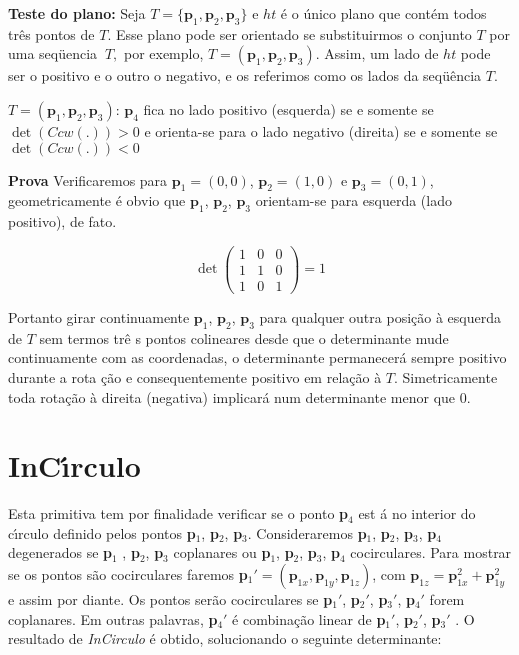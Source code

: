 \documentclass[12pt,a4paper]{book}
\begin{document}
\textbf{Teste do plano: }Seja $T=\{\mathbf{p}_{1},\mathbf{p}_{2},\mathbf{p}%
_{3}\}$ e $ht$ \'{e} o \'{u}nico plano que cont\'{e}m todos tr\^{e}s pontos
de $T$. Esse plano pode ser orientado se substituirmos o conjunto $T$ por
uma seq\"{u}encia $\ T,$ por exemplo, $T=(\mathbf{p}_{1},\mathbf{p}_{2},%
\mathbf{p}_{3}).$ Assim, um lado de $ht$ pode ser o positivo e o outro o
negativo, e os referimos como os lados da seq\"{u}\^{e}ncia $T$.

$T=(\mathbf{p}_{1},\mathbf{p}_{2},\mathbf{p}_{3})$: $\mathbf{p}_{4}$ fica no
lado positivo (esquerda) se e somente se $\det(Ccw(.))>0$ e orienta-se para o
lado negativo (direita) se e somente se $\det(Ccw(.))<0$

{\bf Prova}
 Verificaremos para $\mathbf{p}_{1}=(0,0)$, $\mathbf{p}_{2}=(1,0)$ e 
$\mathbf{p}_{3}=(0,1)$, geometricamente \'{e} obvio que $\mathbf{p}_{1}$,
$\mathbf{p}_{2}$, $\mathbf{p}_{3}$ orientam-se para esquerda (lado positivo), de
fato.

\begin{equation}
\det 
\left(\begin{array}{ccc}
1 & 0 & 0 \\ 
1 & 1 & 0 \\ 
1 & 0 & 1%
\end{array} \right)
=1
\end{equation}

Portanto girar continuamente $\mathbf{p}_{1}$, $\mathbf{p}_{2}$, $\mathbf{p}_{3}$
para qualquer outra posi\c{c}\~{a}o \`{a} esquerda de $T$ sem termos tr\^{e}%
s pontos colineares desde que o determinante mude continuamente com as
coordenadas, o determinante permanecer\'{a} sempre positivo durante a rota%
\c{c}\~{a}o e consequentemente positivo em rela\c{c}\~{a}o \`{a} $T$.
Simetricamente toda rota\c{c}\~{a}o \`{a} direita (negativa) implicar\'{a}
num determinante menor que $0$.

\section{InC\'{\i}rculo}

Esta primitiva tem por finalidade verificar se o ponto \textbf{p}$_{4}$ est%
\'{a} no interior do c\'{\i}rculo definido pelos pontos \textbf{p}$_{1}$, 
\textbf{p}$_{2}$, \textbf{p}$_{3}$. Consideraremos \textbf{p}$_{1}$, \textbf{%
p}$_{2}$, \textbf{p}$_{3}$, \textbf{p}$_{4}$ degenerados se \textbf{p}$_{1}$%
, \textbf{p}$_{2}$, \textbf{p}$_{3}$ coplanares ou \textbf{p}$_{1}$, \textbf{%
p}$_{2}$, \textbf{p}$_{3}$, \textbf{p}$_{4}$ cocirculares. Para mostrar se
os pontos s\~{a}o cocirculares faremos \textbf{p}$_{1}'=(\mathbf{p}_{1x},%
\mathbf{p}_{1y},\mathbf{p}_{1z})$, com $\mathbf{p}_{1z}=\mathbf{p}_{1x}^{2}+%
\mathbf{p}_{1y}^{2}$ e assim por diante. Os pontos ser\~{a}o cocirculares se 
\textbf{p}$_{1}'$, \textbf{p}$_{2}'$, \textbf{p}$_{3}'$, \textbf{p}$_{4}'$ forem coplanares. Em outras palavras, \textbf{p}$_{4}'$ \'{e} combina\c{c}\~{a}o linear de \textbf{p}$_{1}'$, \textbf{p}$_{2}'$, \textbf{p}$_{3}'$ \cite{berg}. O resultado de \textit{InCirculo} \'{e} obtido,
solucionando o seguinte determinante:
\end{document}

